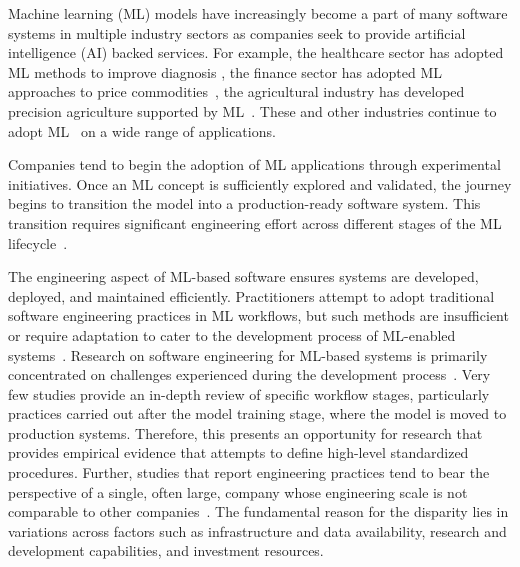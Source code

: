 Machine \DIFaddbegin {}\DIFaddend learning (ML\DIFaddbegin {}\DIFaddend ) models have increasingly become a part of many software systems in multiple industry sectors as companies seek to provide artificial intelligence (AI) backed services. For example, the healthcare sector has adopted ML methods to improve diagnosis \DIFdelbegin \DIFdel{~}\DIFdelend \cite{sharma2021systematic}, the finance sector has adopted ML approaches to price commodities~\cite{ghoddusi2019machine}, the agricultural industry has developed precision agriculture supported by ML~\cite{9505674}. These and other industries continue to adopt ML~\cite{jan2022artificial} on a wide range of applications. \DIFdelbegin %

\DIFdelend Companies tend to begin the adoption of ML applications through experimental initiatives. Once an ML concept is sufficiently explored and validated, the journey begins to transition the model into a production-ready software system. This transition requires significant engineering effort across different stages of the ML lifecycle\DIFdelbegin {}\DIFdelend ~\cite{8498185, lwakatare2019taxonomy}.

The engineering aspect of ML-based software ensures systems are developed, deployed, and maintained efficiently. Practitioners attempt to adopt traditional software engineering practices in ML workflows, but such methods are insufficient or require adaptation to cater to the development process of ML-enabled systems~\cite{amershi2019software}.  
Research on software engineering for ML-based systems is primarily concentrated on challenges experienced during the development process~\cite{8498185, lwakatare2019taxonomy, giray2021software}. Very few studies provide an in-depth review of specific workflow stages, particularly practices carried out after the model training stage, where the model is moved to production systems. Therefore, this presents an opportunity for research that provides empirical evidence that attempts to define high-level standardized procedures. Further, studies that report engineering practices tend to bear the perspective of a single, often large, company whose engineering scale is not comparable to other companies~\cite{amershi2019software, soifer2019deep, Park}. The fundamental reason for the disparity lies in variations across factors such as infrastructure and data availability, research and development capabilities, and investment resources.

